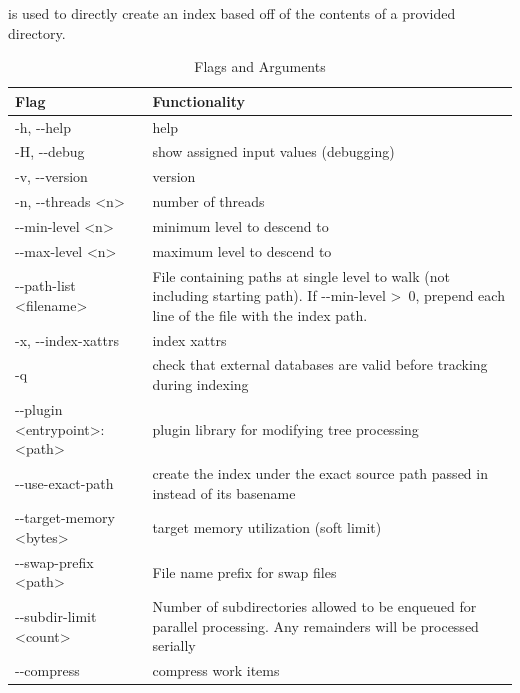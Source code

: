 \subsubsection{\gufidirindex}
\gufidirindex is used to directly create an index based off of the
contents of a provided directory.

\begin{table} [h!]
  \centering
  \begin{tabularx}{\textwidth}{|l|X|}
    \hline
    Flag & Functionality \\
    \hline
    -h, -{}-help & help \\
    \hline
    -H, -{}-debug & show assigned input values (debugging) \\
    \hline
    -v, -{}-version & version \\
    \hline
    -n, -{}-threads \textless n\textgreater & number of threads \\
    \hline
    -{}-min-level \textless n\textgreater & minimum level to descend to \\
    \hline
    -{}-max-level \textless n\textgreater & maximum level to descend to \\
    \hline
    -{}-path-list \textless filename\textgreater & File containing paths at
    single level to walk (not including starting path). If -{}-min-level
    \textgreater \ 0, prepend each line of the file with the index path. \\
    \hline
    -x, -{}-index-xattrs & index xattrs \\
    \hline
    -q & check that external databases are valid before tracking during indexing \\
    \hline
    -{}-plugin \textless entrypoint\textgreater:\textless path\textgreater & plugin library for modifying tree processing \\
    \hline
    -{}-use-exact-path & create the index under the exact source path passed in instead of its basename \\
    \hline
    -{}-target-memory \textless bytes\textgreater & target memory utilization (soft limit) \\
    \hline
    -{}-swap-prefix \textless path\textgreater & File name prefix for swap files \\
    \hline
    -{}-subdir-limit \textless count\textgreater & Number of subdirectories allowed to be enqueued for parallel processing. Any remainders will be processed serially \\
    \hline
    -{}-compress & compress work items \\
    \hline
  \end{tabularx}
  \caption{\gufidirindex Flags and Arguments}
\end{table}

